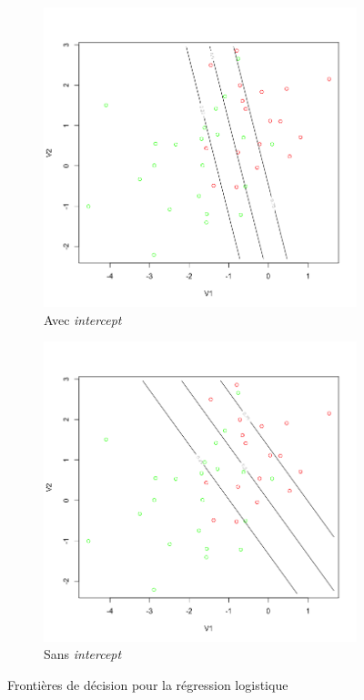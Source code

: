\documentclass[a4paper,10pt]{report}
\begin{document}
\begin{figure}[H]
	\centering
	\captionsetup{justification=centering, margin=2cm}
	\begin{subfigure}[b]{0.5\linewidth}
		\centering
		\captionsetup{justification=centering, margin=1cm}
		\includegraphics[width=1\linewidth]{img/1-3-verif-log-intercept-true}
		\caption{\small Avec \textit{intercept}}
	\end{subfigure}%
	\begin{subfigure}[b]{0.5\linewidth}
		\centering
		\captionsetup{justification=centering, margin=1cm}
		\includegraphics[width=1\linewidth]{img/1-3-verif-log-intercept-false}
		\caption{\small Sans \textit{intercept}}
	\end{subfigure}%
	\caption{\small Frontières de décision pour la régression logistique}
	\label{fig:1-3-log}%
\end{figure}
\end{document}
